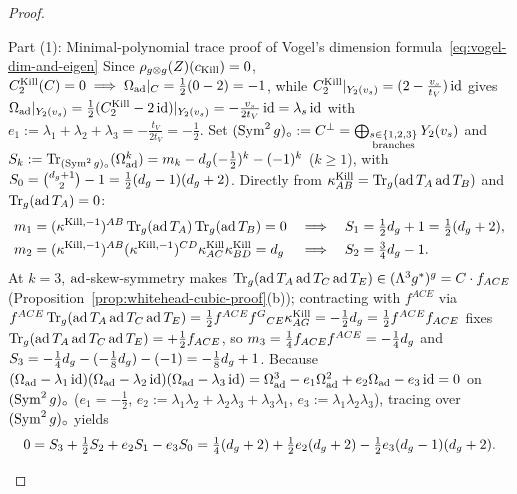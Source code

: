 \begin{proof}\leavevmode
\begin{proofpart}{Part (1): Minimal-polynomial trace proof of Vogel's dimension formula~\eqref{eq:vogel-dim-and-eigen}}
Since $\rho_{g\otimes g}(Z)(c_{\mathrm{Kill}}) = 0$, $C_2^{\mathrm{Kill}}(C) = 0 \implies \Omega_{\mathrm{ad}}|_{C} = \frac{1}{2}(0-2) = -1$, while $C_2^{\mathrm{Kill}}|_{Y_2(v_s)} = (2 - \frac{v_s}{t_V})\operatorname{id}$ gives $\Omega_{\mathrm{ad}}|_{Y_2(v_s)} = \frac{1}{2}(C_2^{\mathrm{Kill}} - 2\operatorname{id})|_{Y_2(v_s)} = -\frac{v_s}{2t_V}\operatorname{id} = \lambda_s\operatorname{id}$ with $e_1 := \lambda_1+\lambda_2+\lambda_3 = -\frac{t_V}{2t_V} = -\frac{1}{2}$. Set $(\operatorname{Sym}^2g)_\circ := C^\perp = \bigoplus_{\substack{s\in\{1,2,3\}\\\mathrm{branches}}}Y_2(v_s)$ and $S_k := \operatorname{Tr}_{(\operatorname{Sym}^2g)_\circ}(\Omega_{\mathrm{ad}}^k) = m_k - d_{g}(-\frac{1}{2})^k - (-1)^k$ ($k \ge 1$), with $S_0 = \binom{d_{g}+1}{2} - 1 = \frac{1}{2}(d_{g}-1)(d_{g}+2)$. Directly from $\kappa^{\mathrm{Kill}}_{AB} = \operatorname{Tr}_{g}(\operatorname{ad} T_A\operatorname{ad} T_B)$ and $\operatorname{Tr}_{g}(\operatorname{ad} T_A) = 0$:
\[
\begin{aligned}
m_1 &= (\kappa^{\mathrm{Kill},-1})^{AB}\operatorname{Tr}_{g}(\operatorname{ad} T_A)\operatorname{Tr}_{g}(\operatorname{ad} T_B) = 0 &&\Longrightarrow\quad S_1 = \tfrac{1}{2}d_{g} + 1 = \tfrac{1}{2}(d_{g} + 2),\\
m_2 &= (\kappa^{\mathrm{Kill},-1})^{AB}(\kappa^{\mathrm{Kill},-1})^{CD}\kappa^{\mathrm{Kill}}_{AC}\kappa^{\mathrm{Kill}}_{BD} = d_{g} &&\Longrightarrow\quad S_2 = \tfrac{3}{4}d_{g} - 1.
\end{aligned}
\]
At $k = 3$, $\operatorname{ad}$-skew-symmetry makes $\operatorname{Tr}_{g}(\operatorname{ad} T_A\operatorname{ad} T_C\operatorname{ad} T_E) \in (\Lambda^3g^*)^{g} = C\cdot f_{ACE}$ (Proposition~\ref{prop:whitehead-cubic-proof}(b)); contracting with $f^{ACE}$ via $f^{ACE}\operatorname{Tr}_{g}(\operatorname{ad} T_A\operatorname{ad} T_C\operatorname{ad} T_E) = \frac{1}{2}f^{ACE}f^G{}_{CE}\kappa^{\mathrm{Kill}}_{AG} = -\frac{1}{2}d_{g} = \frac{1}{2}f^{ACE}f_{ACE}$ fixes $\operatorname{Tr}_{g}(\operatorname{ad} T_A\operatorname{ad} T_C\operatorname{ad} T_E) = +\frac{1}{2}f_{ACE}$, so $m_3 = \frac{1}{4}f_{ACE}f^{ACE} = -\frac{1}{4}d_{g}$ and $S_3 = -\frac{1}{4}d_{g} - (-\frac{1}{8}d_{g}) - (-1) = -\frac{1}{8}d_{g} + 1$. Because $(\Omega_{\mathrm{ad}} - \lambda_1\operatorname{id})(\Omega_{\mathrm{ad}} - \lambda_2\operatorname{id})(\Omega_{\mathrm{ad}} - \lambda_3\operatorname{id}) = \Omega_{\mathrm{ad}}^3 - e_1\Omega_{\mathrm{ad}}^2 + e_2\Omega_{\mathrm{ad}} - e_3\operatorname{id} = 0$ on $(\operatorname{Sym}^2g)_\circ$ ($e_1 = -\frac{1}{2}$, $e_2 := \lambda_1\lambda_2+\lambda_2\lambda_3+\lambda_3\lambda_1$, $e_3 := \lambda_1\lambda_2\lambda_3$), tracing over $(\operatorname{Sym}^2g)_\circ$ yields
\[
0 = S_3 + \tfrac{1}{2}S_2 + e_2 S_1 - e_3 S_0 = \tfrac{1}{4}(d_{g} + 2) + \tfrac{1}{2}e_2(d_{g} + 2) - \tfrac{1}{2}e_3(d_{g} - 1)(d_{g} + 2).
\]
\end{proofpart}
\end{proof}
